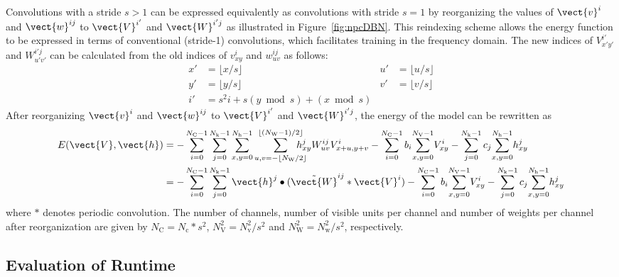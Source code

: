 Convolutions with a stride $s > 1$ can be expressed equivalently as convolutions
with stride $s = 1$ by reorganizing the values of $\vect{v}^i$ and
$\vect{w}^{ij}$ to $\vect{V}^{i'}$ and $\vect{W}^{i'j}$ as illustrated in
Figure~\ref{fig:npcDBN}. This reindexing scheme allows the energy function to be
expressed in terms of conventional (stride-1) convolutions, which facilitates
training in the frequency domain. The new indices of $V^{i'}_{x'y'}$ and
$W^{i'j}_{u'v'}$ can be calculated from the old indices of $v^i_{xy}$ and
$w^{ij}_{uv}$ as follows:
\begin{align}
x' &= \lfloor x / s \rfloor & u' &= \lfloor u / s \rfloor \\
y' &= \lfloor y / s \rfloor & v' &= \lfloor v / s \rfloor \\
i' &= s^2i + s(y \bmod{s}) + (x \bmod{s})
\end{align}
After reorganizing $\vect{v}^i$ and $\vect{w}^{ij}$ to $\vect{V}^{i'}$
and $\vect{W}^{i'j}$, the energy of the model can be rewritten as
\begin{align} 
E(\vect{V},\vect{h}) &= 
-\sum_{i=0}^{N_\text{C}-1}\sum_{j=0}^{N_\text{k}-1}\sum_{x,y=0}^{N_\text{h}-1}
\sum_{u,v=-\lfloor N_\text{W}/2\rfloor}^{\lfloor (N_\text{W}-1)/2\rfloor}
\hspace{-1.2em}h_{xy}^jW_{uv}^{ij}V_{x+u, y+v}^i
- \sum_{i=0}^{N_\text{C}-1}b_i\!\sum_{x,y = 0}^{N_\text{V}-1}\!V_{xy}^i
- \sum_{j=0}^{N_\text{k}-1}c_j\!\sum_{x,y = 0}^{N_\text{h}-1}\!h_{xy}^j\\
&= -\sum_{i=0}^{N_\text{C}-1} \sum_{j=0}^{N_\text{k}-1} \vect{h}^j
\bullet (\tilde{\vect{W}}^{ij} * \vect{V}^i) -
\sum_{i=0}^{N_\text{C}-1}b_i\!\sum_{x,y = 0}^{N_\text{V}-1}\!V_{xy}^i -
\sum_{j=0}^{N_\text{k}-1}c_j\!\sum_{x,y = 0}^{N_\text{h}-1}\!h_{xy}^j
\end{align}
where $*$ denotes periodic convolution. The number of channels, number of
visible units per channel and number of weights per channel after reorganization
are given by $N_\text{C} = N_\text{c} * s^2$, $N_\text{V}^2 = N_\text{v}^2 /
s^2$ and $N_\text{W}^2 = N_\text{w}^2 / s^2$, respectively.

\subsection{Evaluation of Runtime}


